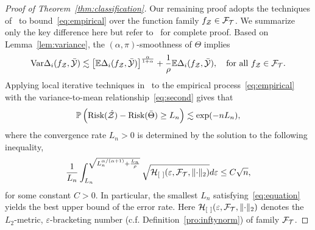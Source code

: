 \documentclass[11pt]{article}
\theoremstyle{plain}
\theoremstyle{definition}
\def\risk{\textup{Risk}}
\begin{document}
\begin{proof}[Proof of Theorem~\ref{thm:classification}]
Our remaining proof adopts the techniques of~\citet[Theorem 3]{wang2008probability} to bound~\eqref{eq:empirical} over the function family $f_{\mathcal{Z}}\in \mathcal{F}_{\mathcal{T}}$. We summarize only the key difference here but refer to~\citep{wang2008probability} for complete proof. 
Based on Lemma~\ref{lem:variance}, the $(\alpha,\pi)$-smoothness of $\Theta$ implies 
\begin{equation}\label{eq:second}
\textup{Var}\Delta_i(f_{\mathcal{Z}},\bar {\mathcal{Y}}) \lesssim \left[\mathbb{E}\Delta_i(f_{\mathcal{Z}},\bar {\mathcal{Y}})\right]^{\alpha \over 1+\alpha}+{1\over \rho}\mathbb{E}\Delta_i(f_{\mathcal{Z}},\bar {\mathcal{Y}}),\quad \text{for all $f_{\mathcal{Z}}\in \mathcal{F}_{\mathcal{T}}$}.
\end{equation}
Applying local iterative techniques in~\citet[Theorem 3]{wang2008probability} to the empirical process~\eqref{eq:empirical} with the variance-to-mean relationship~\eqref{eq:second} gives that
\begin{equation}\label{eq:rate}
\mathbb{P}\left(\risk(\hat \tZ)-\risk(\bar \Theta )\geq L_n\right)\lesssim \exp(-nL_n),
\end{equation}
where the convergence rate $L_n>0$ is determined by the solution to the following inequality,
\begin{equation}\label{eq:equation}
{1\over L_n}\int_{L_n}^{\sqrt{L_n^{\alpha/(\alpha+1)}+{L_n\over \rho}}}\sqrt{\mathcal{H}_{[\ ]}(\varepsilon,\mathcal{F}_{\mathcal{T}}, \lVert\cdot\rVert_2) }d\varepsilon \leq C\sqrt{n},
\end{equation}
for some constant $C>0$. In particular, the smallest $L_n$ satisfying~\eqref{eq:equation} yields the best upper bound of the error rate. Here $\tH_{[\ ]}(\varepsilon, \tF_{\tT},\vnormSize{}{\cdot})$ denotes the $L_2$-metric, $\varepsilon$-bracketing number (c.f. Definition~\ref{pro:inftynorm}) of family $\mathcal{F}_{\mathcal{T}}$. 


\end{proof}
\end{document}
